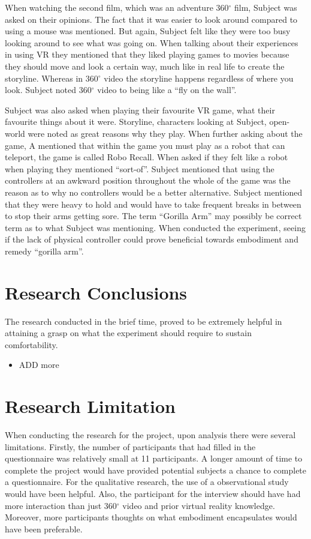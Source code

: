 \documentclass[12pt]{report}
\begin{document}
When watching the second film, which was an adventure 360${}^\circ$ film, Subject was asked on their opinions. The fact that it was easier to look around compared to using a mouse was mentioned. But again, Subject felt like they were too busy looking around to see what was going on. When talking about their experiences in using VR they mentioned that they liked playing games to movies because they should move and look a certain way, much like in real life to create the storyline. Whereas in 360${}^\circ$ video the storyline happens regardless of where you look. Subject noted 360${}^\circ$ video to being like a “fly on the wall”. 

Subject was also asked when playing their favourite VR game, what their favourite things about it were. Storyline, characters looking at Subject, open-world were noted as great reasons why they play. When further asking about the game, A mentioned that within the game you must play as a robot that can teleport, the game is called Robo Recall. When asked if they felt like a robot when playing they mentioned “sort-of”. Subject mentioned that using the controllers at an awkward position throughout the whole of the game was the reason as to why no controllers would be a better alternative. Subject mentioned that they were heavy to hold and would have to take frequent breaks in between to stop their arms getting sore. The term “Gorilla Arm” may possibly be correct term as to what Subject was mentioning. When conducted the experiment, seeing if the lack of physical controller could prove beneficial towards embodiment and remedy “gorilla arm”.

\section{Research Conclusions}
The research conducted in the brief time, proved to be extremely helpful in attaining a grasp on what the experiment should require to sustain comfortability.
 \begin{itemize}
	
	\item ADD more
\end{itemize}

\section{Research Limitation}
When conducting the research for the project, upon analysis there were several limitations. Firstly, the number of participants that had filled in the questionnaire was relatively small at 11 participants. A longer amount of time to complete the project would have provided potential subjects a chance to complete a questionnaire.  For the qualitative research, the use of a observational study would have been helpful.  Also, the participant for the interview should have had more interaction than just 360${}^\circ$ video and prior virtual reality knowledge. Moreover, more participants thoughts on what embodiment encapsulates would have been preferable. 
\end{document}
